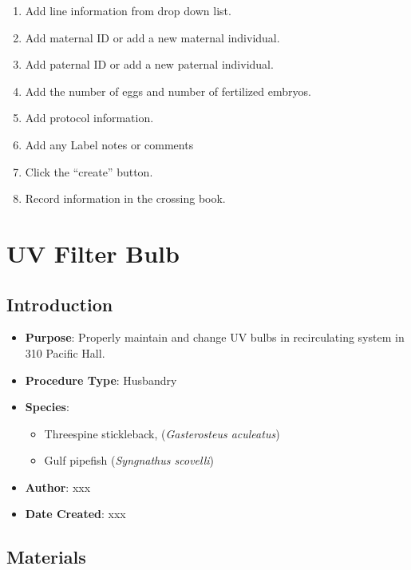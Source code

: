\documentclass[
  letterpaper,
  DIV=11,
  numbers=noendperiod]{scrreprt}
\providecommand{\tightlist}{%
  \setlength{\itemsep}{0pt}\setlength{\parskip}{0pt}}\usepackage{longtable,booktabs,array}
\begin{document}
\begin{enumerate}
\def\labelenumi{\arabic{enumi}.}
\setcounter{enumi}{4}
\tightlist
\item
  Add line information from drop down list.
\item
  Add maternal ID or add a new maternal individual.
\item
  Add paternal ID or add a new paternal individual.
\item
  Add the number of eggs and number of fertilized embryos.
\item
  Add protocol information.
\item
  Add any Label notes or comments
\item
  Click the ``create'' button.
\item
  Record information in the crossing book.
\end{enumerate}

\hypertarget{sec-husbandry-UV_bulb}{%
\chapter{UV Filter Bulb}\label{sec-husbandry-UV_bulb}}

\hypertarget{introduction-37}{%
\section{Introduction}\label{introduction-37}}

\begin{itemize}
\tightlist
\item
  \textbf{Purpose}: Properly maintain and change UV bulbs in
  recirculating system in 310 Pacific Hall.
\item
  \textbf{Procedure Type}: Husbandry
\item
  \textbf{Species}:

  \begin{itemize}
  \tightlist
  \item
    Threespine stickleback, (\emph{Gasterosteus aculeatus})
  \item
    Gulf pipefish (\emph{Syngnathus scovelli})
  \end{itemize}
\item
  \textbf{Author}: xxx
\item
  \textbf{Date Created}: xxx
\end{itemize}

\hypertarget{materials-35}{%
\section{Materials}\label{materials-35}}
\end{document}
